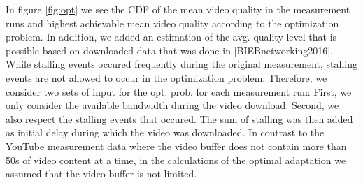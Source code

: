 In figure \ref{fig:opt} we see the CDF of the mean video quality in the measurement runs and highest achievable mean video quality according to the optimization problem. In addition, we added an estimation of the avg. quality level that is possible based on downloaded data that was done in [BIEBnetworking2016]. While stalling events occured frequently during the original measurement, stalling events are not allowed to occur in the optimization problem. Therefore, we consider two sets of input for the opt. prob. for each measurement run: First, we only consider the available bandwidth during the video download. Second, we also respect the stalling events that occured. The sum of stalling was then added as initial delay during which the video was downloaded. In contrast to the YouTube measurement data where the video buffer does not contain more than 50s of video content at a time, in the calculations of the optimal adaptation we assumed that the video buffer is not limited.
